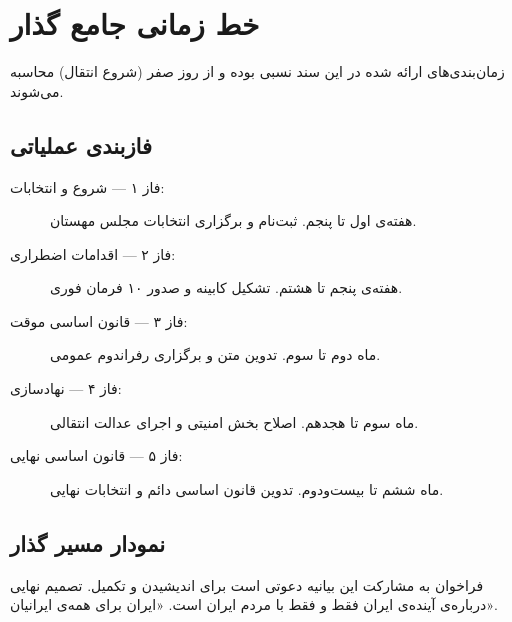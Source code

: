 \chapter{خط زمانی جامع گذار}

زمان‌بندی‌های ارائه شده در این سند نسبی بوده و از روز صفر (شروع انتقال) محاسبه می‌شوند.

\section{فازبندی عملیاتی}

\begin{description}
    \item[فاز ۱ — شروع و انتخابات:] هفته‌ی اول تا پنجم. ثبت‌نام و برگزاری انتخابات مجلس مهستان.
    \item[فاز ۲ — اقدامات اضطراری:] هفته‌ی پنجم تا هشتم. تشکیل کابینه و صدور ۱۰ فرمان فوری.
    \item[فاز ۳ — قانون اساسی موقت:] ماه دوم تا سوم. تدوین متن و برگزاری رفراندوم عمومی.
    \item[فاز ۴ — نهادسازی:] ماه سوم تا هجدهم. اصلاح بخش امنیتی و اجرای عدالت انتقالی.
    \item[فاز ۵ — قانون اساسی نهایی:] ماه ششم تا بیست‌ودوم. تدوین قانون اساسی دائم و انتخابات نهایی.
\end{description}

\section{نمودار مسیر گذار}

\begin{center}
\end{center}

\bigskip
\begin{modernbox}{فراخوان به مشارکت}
این بیانیه دعوتی است برای اندیشیدن و تکمیل. تصمیم نهایی درباره‌ی آینده‌ی ایران فقط و فقط با مردم ایران است. «ایران برای همه‌ی ایرانیان».
\end{modernbox}
